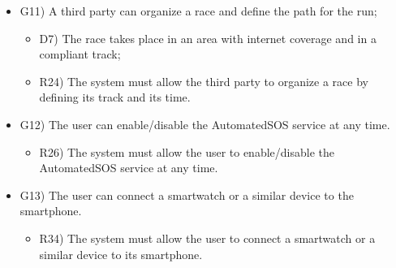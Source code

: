 \documentclass{article}
\begin{document}
\begin{legal}
\begin{legal}
\begin{legal}
\begin{itemize}
{				}
				\item G11) A third party can organize a race and define the path for the run;\\
				{\normalfont
					\begin{itemize}
					\item D7) The race takes place in an area with internet coverage and in a compliant track;\\
					\item R24) The system must allow the third party to organize a race by defining its track and its time.\\
					\end{itemize}
				}
				\item G12) The user can enable/disable the AutomatedSOS service at any time.\\
				{\normalfont
					\begin{itemize}
					\item R26) The system must allow the user to enable/disable the AutomatedSOS service at any time.\\
					\end{itemize}
				}
				\item G13) The user can connect a smartwatch or a similar device to the smartphone.\\
				{\normalfont
					\begin{itemize}
					\item R34) The system must allow the user to connect a smartwatch or a similar device to its smartphone.\\
					\end{itemize}
				}
				\end{itemize}
			\end{legal}
    		

\end{legal}
\end{legal}
\end{document}
